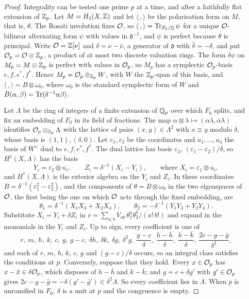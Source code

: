 \begin{proof}
Integrality can be tested one prime $p$ at a time, and after a faithfully
flat extension of $\mathbb{Z}_{p}$. Let $M=H_{1}(X,\mathbb{Z})$ and let $\langle\,,\rangle$
be the polarisation form on $M$, that is, $\theta$. The Rosati involution fixes
$\mathcal{O}$, so $\langle\,,\rangle=\operatorname{Tr}_{F_{0}/\mathbb{Q}}\psi$ for a unique $\mathcal{O}$-bilinear
alternating form $\psi$ with values in $\mathfrak d^{-1}$, and $\psi$ is
perfect because $\theta$ is principal. Write $\mathcal{O}=\mathbb{Z}[\nu]$ and
$\delta=\nu-\bar\nu$, a generator of $\mathfrak d$
with $\bar\delta=-\delta$, and put $\mathcal{O}_{p}=\mathcal{O}\otimes\mathbb{Z}_{p}$, a product of
at most two discrete valuation rings. The form $\delta\psi$ on
$M_{p}=M\otimes\mathbb{Z}_{p}$ is perfect with values in $\mathcal{O}_{p}$, so $M_{p}$ has a
symplectic $\mathcal{O}_{p}$-basis $e,f,e^{*},f^{*}$. Hence
$M_{p}=\mathcal{O}_{p}\otimes_{\mathbb{Z}_{p}}W$, with $W$ the $\mathbb{Z}_{p}$-span of this basis,
and $\langle\,,\rangle=B\otimes\omega_{0}$, where $\omega_{0}$ is the standard
symplectic form of $W$ and $B(\alpha,\beta)=\operatorname{Tr}(\delta^{-1}\alpha\beta)$.

Let $\Lambda$ be the ring of integers of a finite extension of $\mathbb{Q}_{p}$ over
which $F_{0}$ splits, and fix an embedding of $F_{0}$ in its field of
fractions. The map $\alpha\otimes\lambda\mapsto(\alpha\lambda,\bar\alpha\lambda)$
identifies $\mathcal{O}_{p}\otimes_{\mathbb{Z}_{p}}\Lambda$ with the lattice of pairs
$(x,y)\in\Lambda^{2}$ with $x\equiv y$ modulo $\delta$, whose basis is
$(1,1),(\delta,0)$. Let $\varepsilon_{1},\varepsilon_{2}$ be the coordinates
and $u_{1},\dots,u_{4}$ the basis of $W^{\vee}$ dual to $e,f,e^{*},f^{*}$. The
dual lattice has basis $\varepsilon_{2}$, $(\varepsilon_{1}-\varepsilon_{2})/\delta$,
so $H^{1}(X,\Lambda)$ has the basis
\[
  Y_{i}=\varepsilon_{2}\otimes u_{i},\qquad
  Z_{i}=\delta^{-1}(X_{i}-Y_{i}),\qquad\text{where }X_{i}=\varepsilon_{1}\otimes u_{i},
\]
and $H^{*}(X,\Lambda)$ is the exterior algebra on the $Y_{i}$ and $Z_{i}$. In
these coordinates $B=\delta^{-1}(\varepsilon_{1}^{2}-\varepsilon_{2}^{2})$, and the
components of $\theta=B\otimes\omega_{0}$ in the two eigenspaces of $\mathcal{O}$, the
first being the one on which $\mathcal{O}$ acts through the fixed embedding, are
\[
  \theta_{1}=\delta^{-1}(X_{1}X_{3}+X_{2}X_{4}),\qquad
  \theta_{2}=-\delta^{-1}(Y_{1}Y_{3}+Y_{2}Y_{4}).
\]
Substitute $X_{i}=Y_{i}+\delta Z_{i}$ in $v=\sum_{a,b}V_{ab}\,\theta_{1}^{a}
\theta_{2}^{b}/(a!\,b!)$ and expand in the monomials in the $Y_{i}$ and $Z_{i}$.
Up to sign, every coefficient is one of
\[
  r,\ m,\ h,\ k,\ c,\ g,\ g-c,\ \delta h,\ \delta k,\ \delta g,\ \delta^{2}g,\
  \frac{g-c}{\delta},\ \frac{h-\bar h}{\delta},\ \frac{k-\bar k}{\delta},\
  \frac{2c-g-\bar g}{\delta^{2}},
\]
and each of $r$, $m$, $h$, $k$, $c$, $g$ and $(g-c)/\delta$ occurs, so an
integral class satisfies the conditions at $p$. Conversely, suppose that they
hold. Every $x\in\mathcal{O}_{p}$ has $x-\bar x\in\delta\mathcal{O}_{p}$, which disposes of
$h-\bar h$ and $k-\bar k$; and $g=c+\delta g'$ with $g'\in\mathcal{O}_{p}$ gives
$2c-g-\bar g=-\delta(g'-\bar g')\in\delta^{2}\Lambda$. So every coefficient
lies in $\Lambda$. When $p$ is unramified in $F_{0}$, $\delta$ is a unit at
$p$ and the congruence is empty.
\end{proof}


